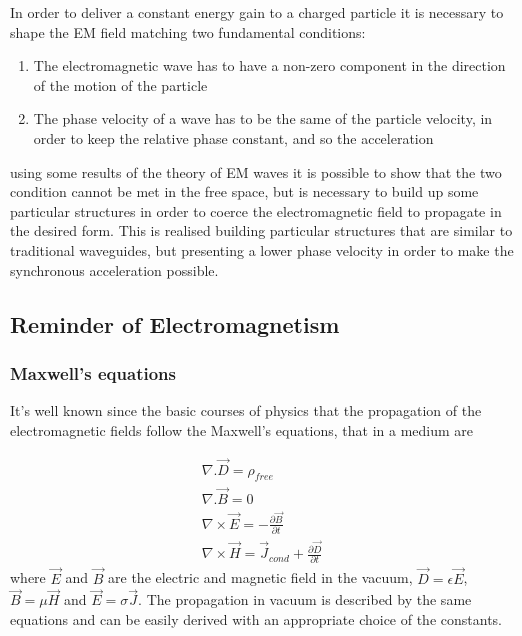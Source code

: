 In order to deliver a  constant energy gain to a charged particle it is necessary to shape the EM field matching  two fundamental conditions:

\begin{enumerate}
\item The electromagnetic wave has to have a non-zero component in the direction of the motion of the particle
\item The phase velocity of a wave has to be the same of the particle velocity, in order to keep the relative phase constant, and so the acceleration
\end{enumerate}
using some results of the theory of EM waves it is possible to show that the two condition cannot be met in the free space, but is necessary to build up some particular structures in order to coerce the electromagnetic field to propagate in the desired form. This is realised building particular structures that are similar to traditional waveguides, but presenting a lower phase velocity in order to make the synchronous acceleration possible.


\subsection[Reminder of Electromagnetism]{Reminder of Electromagnetism}

\subsubsection{Maxwell's equations}

It's well known since the basic courses of physics that the propagation of the electromagnetic fields follow the Maxwell's equations, that in a medium are

\begin{equation}
\begin{aligned}
\nabla . \vec{D} = \rho_{free}\\
\nabla . \vec{B} = 0\\
\nabla \times \vec{E} = - \frac{\partial \vec{B}}{\partial t}\\
\nabla \times \vec{H} = \vec{J}_{cond} + \frac{\partial \vec{D}}{\partial t}
\end{aligned}
\end{equation}
where $\vec{E}$ and $\vec{B}$ are the electric and magnetic field in the vacuum, $\vec{D} = \epsilon \vec{E}$, $\vec{B} = \mu \vec{H}$ and $\vec{E} = \sigma \vec{J}$. The propagation in vacuum is described by the same equations and can be easily derived with an appropriate choice of the constants.

